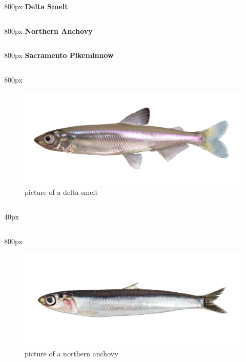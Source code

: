 \documentclass[
]{book}
\begin{document}
\begin{column}{800px\textwidth}
\textbf{Delta Smelt}
\end{column}

\begin{column}{800px\textwidth}
\textbf{Northern Anchovy}
\end{column}

\begin{column}{800px\textwidth}
\textbf{Sacramento Pikeminnow}
\end{column}

\begin{column}{800px\textwidth}
\begin{figure}

{\centering \includegraphics[width=29.17in]{figures/delta_smelt} 

}

\caption{picture of a delta smelt}\label{fig:unnamed-chunk-76}
\end{figure}
\end{column}

\begin{column}{40px\textwidth}
~
\end{column}

\begin{column}{800px\textwidth}
\begin{figure}

{\centering \includegraphics[width=14.58in]{figures/Anchovy-1} 

}

\caption{picture of a northern anchovy}\label{fig:unnamed-chunk-77}
\end{figure}
\end{column}
\end{document}
